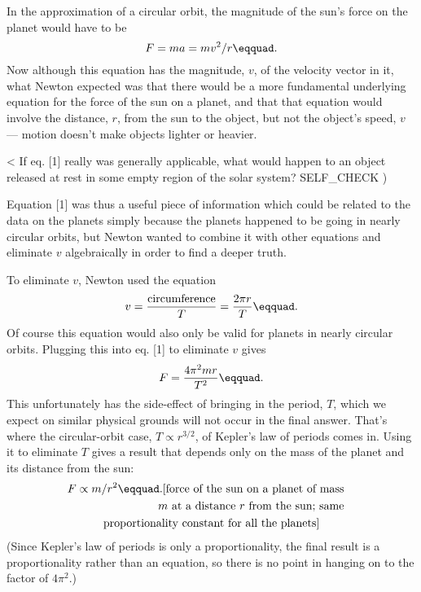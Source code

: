 In the approximation of a circular orbit, the magnitude of
the sun's force on the planet would have to be
\begin{equation}
    F=   ma=      mv^2/r\eqquad.
\end{equation}
Now although this equation has the magnitude, $v$, of the
velocity vector in it, what Newton expected was that there
would be a more fundamental underlying equation for the
force of the sun on a planet, and that that equation would
involve the distance, $r$, from the sun to the object, but
not the object's speed, $v$ --- motion doesn't make
objects lighter or heavier.

<%
If eq. [1] really was generally applicable, what would
happen to an object released at rest in some empty region
of the solar system?
  SELF_CHECK
  ) %

Equation [1] was thus a useful piece of information which
could be related to the data on the planets simply because
the planets happened to be going in nearly circular orbits,
but Newton wanted to combine it with other equations and
eliminate $v$ algebraically in order to find a deeper truth.

To eliminate $v$, Newton used the equation
\begin{equation}
        v    =   \frac{\text{circumference}}{T} =    \frac{2\pi r}{T}\eqquad.
\end{equation}
Of course this equation would also only be valid for planets
in nearly circular orbits. Plugging this into eq. [1]
to eliminate $v$ gives
\begin{equation}
        F     =  \frac{4\pi^2mr}{T^2}\eqquad.    
\end{equation}
This unfortunately has the side-effect of bringing in the
period, $T$, which we expect on similar physical grounds
will not occur in the final answer. That's where the
circular-orbit case, $T \propto r^{3/2}$,  of Kepler's law of periods comes in. Using
it to eliminate $T$ gives a result that depends only on the
mass of the planet and its distance from the sun:
\begin{multline*}
    F\propto m/r^2\eqquad. \hfill \shoveright{\text{[force of the sun on a planet of mass}}\\
                                       \shoveright{\text{$m$ at a distance $r$ from the sun; same}}\\
                                       \text{proportionality constant for all the planets]}
\end{multline*}
(Since Kepler's law of periods is only a proportionality,
the final result is a proportionality rather than an
equation, so there is no point in hanging on to the
factor of $4\pi ^2$.)


